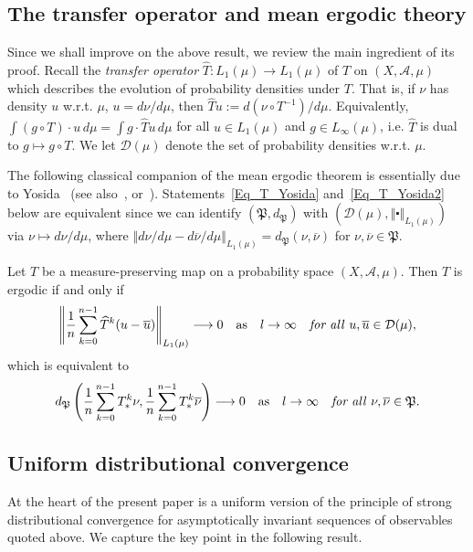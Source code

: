 \documentclass[AHL,Unicode,longabstracts]{cedram}
\newcommand{\clA}{\mathcal{A}}
\newcommand{\clD}{\mathcal{D}}
\newcommand{\frkP}{\mathfrak{P}}
\begin{document}
\subsection{The transfer operator and mean ergodic theory}
Since we shall improve on the above result, we review the main ingredient of its proof. Recall the \emph{transfer operator} $\widehat{T}:L_{1}(\mu)\rightarrow L_{1}(\mu)$ of $T$ on $(X,\clA,\mu)$ which describes the evolution of probability densities under $T$. That is, if $\nu$ has density $u$ w.r.t. $\mu$, $u=d\nu/d\mu$, then $\widehat{T}u:=d(\nu\circ T^{-1})/d\mu$. Equivalently, $\int(g\circ T)\cdot u\,d\mu=\int g\cdot\widehat{T}u\,d\mu$ for all $u\in L_{1}(\mu)$ and $g\in L_{\infty}(\mu)$, i.e. $\widehat{T}$ is dual to $g\longmapsto g\circ T$. We let $\clD(\mu)$ denote the set of probability densities w.r.t. $\mu$.


The following classical companion of the mean ergodic theorem is essentially due to Yosida~\cite{Yos} (see also~\cite[Theorem~2.1.3]{Kr},  or~\cite[Theorem~2]{Z7}). Statements~\eqref{Eq_T_Yosida} and~\eqref{Eq_T_Yosida2} below are equivalent since we can identify $(\frkP,d_{\frkP})$ with $(\clD(\mu),\left\Vert \centerdot\right\Vert _{L_{1}(\mu)})$ via $\nu\mapsto d\nu/d\mu$, where $\left\Vert d\nu/d\mu-d\overline{\nu} /d\mu\right\Vert _{L_{1}(\mu)}=d_{\frkP}(\nu,\overline{\nu})$ for $\nu,\overline{\nu}\in\frkP$.

\begin{theo}\label{T_Yosida}
Let $T$ be a measure-preserving map on a probability space $(X,\clA,\mu)$. Then $T$ is ergodic if and only if 
\begin{equation}\label{Eq_T_Yosida}
\left\Vert \frac{1}{n}\sum_{k=0}^{n-1}\widehat{T}^{k}(u-\overline {u})\right\Vert _{L_{1}(\mu)}\longrightarrow0\quad\text{as}\quad l\rightarrow
\infty\quad\text{\textit{for all} }u,\overline{u}\in\clD(\mu),
\end{equation}
which is equivalent to
\begin{equation}\label{Eq_T_Yosida2}
d_{\frkP}\left(\frac{1}{n}\sum_{k=0}^{n-1}T_{\ast}^{k}\nu,\frac{1} {n}\sum_{k=0}^{n-1}T_{\ast}^{k}\overline{\nu}\right) \longrightarrow0\quad \text{as}\quad l\rightarrow\infty\quad\text{\textit{for all} }\nu,\overline{\nu}
\in\frkP.
\end{equation}
\end{theo}


\subsection{Uniform distributional convergence}
At the heart of the present paper is a uniform version of the principle of strong distributional convergence for asymptotically invariant sequences of observables quoted above. We capture the key point in the following result.
\end{document}
